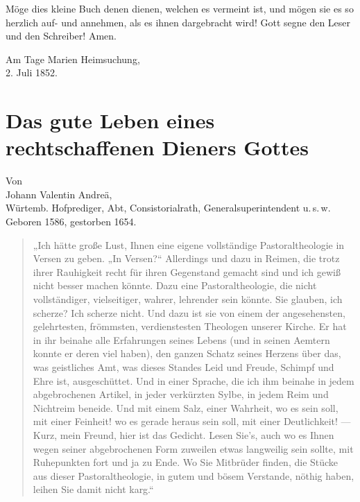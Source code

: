 Möge dies kleine Buch denen dienen, welchen es vermeint ist, und mögen sie es so herzlich auf- und annehmen, als es ihnen dargebracht wird! Gott segne den Leser und den Schreiber! Amen.

\begin{unterschrift}
Am Tage Marien Heimsuchung,\\
2. Juli 1852.
\end{unterschrift}

\chapter{Das gute Leben eines rechtschaffenen Dieners Gottes}

\begin{center}
Von\\
Johann Valentin Andreä,\\
Würtemb. Hofprediger, Abt, Consistorialrath, Generalsuperintendent u.\,s.\,w.\\
Geboren 1586, gestorben 1654.
\end{center}

\begin{quote}
„Ich hätte große Lust, Ihnen eine eigene vollständige Pastoraltheologie in Versen zu geben. „In Versen?“ Allerdings und dazu in Reimen, die trotz ihrer Rauhigkeit recht für ihren Gegenstand gemacht sind und ich gewiß nicht besser machen könnte. Dazu eine Pastoraltheologie, die nicht vollständiger, vielseitiger, wahrer, lehrender sein könnte. Sie glauben, ich scherze? Ich scherze nicht. Und dazu ist sie von einem der angesehensten, gelehrtesten, frömmsten, verdienstesten Theologen unserer Kirche. Er hat in ihr beinahe alle Erfahrungen seines Lebens (und in seinen Aemtern konnte er deren viel haben), den ganzen Schatz seines Herzens über das, was geistliches Amt, was dieses Standes Leid und Freude, Schimpf und Ehre ist, ausgeschüttet. Und in einer Sprache, die ich ihm beinahe in jedem abgebrochenen Artikel, in jeder verkürzten Sylbe, in jedem Reim und Nichtreim beneide. Und mit einem Salz, einer Wahrheit, wo es sein soll, mit einer Feinheit! wo es gerade heraus sein soll, mit einer Deutlichkeit! — Kurz, mein Freund, hier ist das Gedicht. Lesen Sie’s, auch wo es Ihnen wegen seiner abgebrochenen Form zuweilen etwas langweilig sein sollte, mit Ruhepunkten fort und ja zu Ende. Wo Sie Mitbrüder finden, die Stücke aus dieser Pastoraltheologie, in gutem und bösem Verstande, nöthig haben, leihen Sie damit nicht karg.“
\end{quote}

